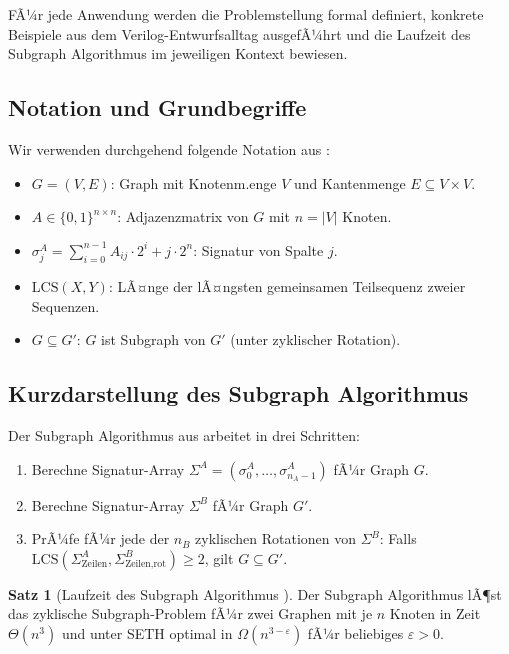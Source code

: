 ﻿\documentclass[a4paper,12pt]{article}
\theoremstyle{definition}
\newtheorem{satz}{Satz}
\begin{document}
FÃ¼r jede Anwendung werden die Problemstellung formal definiert, konkrete Beispiele
aus dem Verilog-Entwurfsalltag ausgefÃ¼hrt und die Laufzeit des Subgraph Algorithmus im
jeweiligen Kontext bewiesen.

\subsection{Notation und Grundbegriffe}

Wir verwenden durchgehend folgende Notation aus \cite{subgraph2026}:

\begin{itemize}
  \item $G = (V, E)$: Graph mit Knotenm.\:enge $V$ und Kantenmenge $E \subseteq V \times V$.
  \item $A \in \{0,1\}^{n \times n}$: Adjazenzmatrix von $G$ mit $n = |V|$ Knoten.
  \item $\sigma_j^A = \sum_{i=0}^{n-1} A_{ij} \cdot 2^i + j \cdot 2^n$: Signatur von Spalte $j$.
  \item $\text{LCS}(X, Y)$: LÃ¤nge der lÃ¤ngsten gemeinsamen Teilsequenz zweier Sequenzen.
  \item $G \subseteq G'$: $G$ ist Subgraph von $G'$ (unter zyklischer Rotation).
\end{itemize}

\subsection{Kurzdarstellung des Subgraph Algorithmus}

Der Subgraph Algorithmus aus \cite{subgraph2026} arbeitet in drei Schritten:

\begin{enumerate}
  \item Berechne Signatur-Array $\Sigma^A = (\sigma_0^A, \ldots, \sigma_{n_A-1}^A)$ fÃ¼r Graph $G$.
  \item Berechne Signatur-Array $\Sigma^B$ fÃ¼r Graph $G'$.
  \item PrÃ¼fe fÃ¼r jede der $n_B$ zyklischen Rotationen von $\Sigma^B$: Falls
        $\text{LCS}(\Sigma^A_{\text{Zeilen}}, \Sigma^B_{\text{Zeilen,rot}}) \geq 2$, gilt $G \subseteq G'$.
\end{enumerate}

\begin{satz}[Laufzeit des Subgraph Algorithmus {\cite{subgraph2026}}]\label{satz:basis}
  Der Subgraph Algorithmus lÃ¶st das zyklische Subgraph-Problem fÃ¼r zwei Graphen mit je $n$
  Knoten in Zeit $\Theta(n^3)$ und unter SETH optimal in $\Omega(n^{3-\varepsilon})$ fÃ¼r
  beliebiges $\varepsilon > 0$.
\end{satz}
\end{document}
